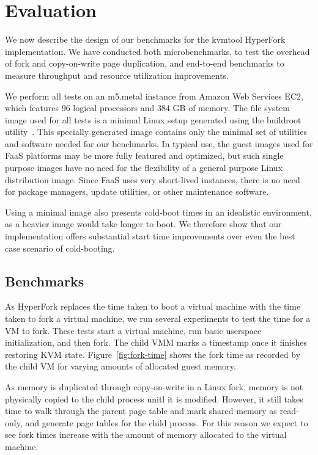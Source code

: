 \section{Evaluation} \label{sec:evaluation} We now describe the
design of our benchmarks for the kvmtool HyperFork implementation. We have
conducted both microbenchmarks, to test the overhead of fork and copy-on-write
page duplication, and end-to-end benchmarks to measure throughput and resource
utilization improvements.

We perform all tests on an m5.metal instance from Amazon Web Services EC2,
which features 96 logical processors and 384 GB of memory. The file system
image used for all tests is a minimal Linux setup generated using the buildroot
utility~\cite{buildroot}. This specially generated image contains only
the minimal set of utilities and software needed for our benchmarks. In typical
use, the guest images used for FaaS platforms may be more fully featured and
optimized, but such single purpose images have no need for the flexibility of a
general purpose Linux distribution image. Since FaaS uses very short-lived
instances, there is no need for package managers, update utilities, or other
maintenance software.

Using a minimal image also presents cold-boot times in an idealistic
environment, as a heavier image would take longer to boot. We therefore show
that our implementation offers substantial start time improvements over even
the best case scenario of cold-booting.

\subsection{Benchmarks}

 As HyperFork replaces the time taken to boot a virtual
machine with the time taken to fork a virtual machine, we run several
experiments to test the time for a VM to fork. These tests start a virtual
machine, run basic userspace initialization, and then fork. The child VMM marks
a timestamp once it finishes restoring KVM state. Figure~\ref{fig:fork-time}
shows the fork time as recorded by the child VM for varying amounts of
allocated guest memory.

As memory is duplicated through copy-on-write in a Linux fork, memory is not
physically copied to the child process unitl it is modified. However, it still
takes time to walk through the parent page table and mark shared memory as
read-only, and generate page tables for the child process. For this reason we
expect to see fork times increase with the amount of memory allocated to the
virtual machine.

